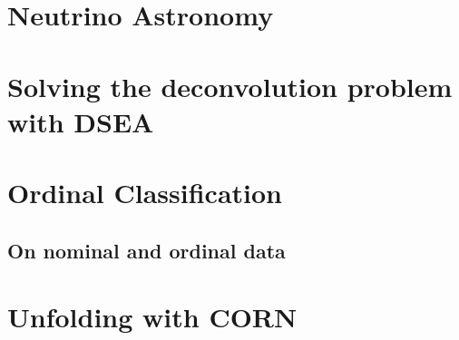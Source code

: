 
\chapter{Neutrino Astronomy}
  
  
  
\chapter{Solving the deconvolution problem with DSEA}
  
  
  
\chapter{Ordinal Classification}
  
  \section{On nominal and ordinal data}
  \blindtext[2]
  
\chapter{Unfolding with CORN}
  
  
  
  
  
  

